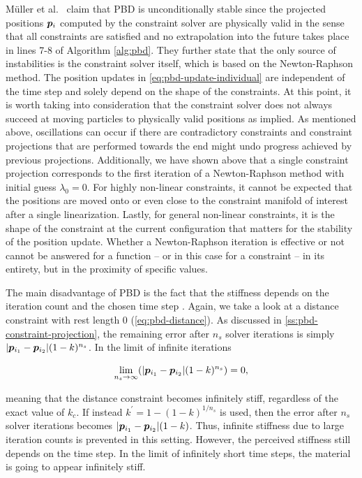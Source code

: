 Müller et al.\ \cite{mueller2006} claim that PBD is unconditionally stable since the projected positions $\bm{p}_i$ computed by the constraint 
solver are physically valid in the sense that all constraints are satisfied and no extrapolation into the future takes place in lines 7-8 of
Algorithm \ref{alg:pbd}. They further state that the only source of instabilities is the constraint solver itself, which is based on the Newton-Raphson 
method. The position updates in \autoref{eq:pbd-update-individual} are independent of the time step and solely depend on the shape of the
constraints. At this point, it is worth taking into consideration that the constraint solver does not always succeed at moving particles to 
physically valid
positions as implied. As mentioned above, oscillations can occur if there are contradictory constraints and constraint projections that are 
performed towards the end might undo progress achieved by previous projections. Additionally, we have shown above that a single constraint 
projection corresponds to the first iteration of a Newton-Raphson method with initial guess $\lambda_0 = 0$. For highly non-linear constraints, 
it cannot be expected that the positions are moved onto or even close to the constraint manifold of interest after a single linearization. 
Lastly, for general non-linear constraints, it is the shape of the constraint at the current configuration that matters for the stability of 
the position update. Whether a Newton-Raphson iteration is effective or not cannot be answered for a function -- or in this case for a 
constraint -- in its entirety, but in the proximity of specific values.

The main disadvantage of PBD is the fact that the stiffness depends on the iteration count and the chosen time step \cite{mueller2006}. Again, 
we take a look at
a distance constraint with rest length 0 (\cref{eq:pbd-distance}). As discussed in \cref{ss:pbd-constraint-projection}, the remaining error after
$n_s$ solver iterations is simply $\vert \bm{p}_{i_1} - \bm{p}_{i_2} \vert (1-k)^{n_s}$. In the limit of infinite iterations

\[
    \lim_{n_s \to \infty} (\vert \bm{p}_{i_1} - \bm{p}_{i_2} \vert (1-k)^{n_s}) = 0,
\]

\noindent meaning that the distance constraint becomes infinitely stiff, regardless of the exact value of $k_c$. If instead $k^{\prime}
= 1 - (1-k)^{1/n_s}$ is used, then the error after $n_s$ solver iterations becomes $\vert \bm{p}_{i_1} - \bm{p}_{i_2} \vert (1-k)$. Thus,
infinite stiffness due to large iteration counts is prevented in this setting. However, the perceived stiffness still depends on the time
step. In the limit of infinitely short time steps, the material is going to appear infinitely stiff. 

